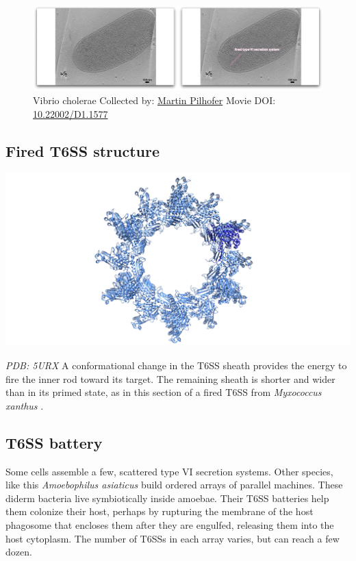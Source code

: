 \documentclass[]{tufte-book}
\begin{document}
\begin{figure}
\includegraphics{movie_stills/9_7} \caption[Vibrio cholerae Collected by:
\protect\hyperlink{martin_pilhofer}{Martin Pilhofer} Movie DOI:
\href{https://doi.org/10.22002/D1.1577}{10.22002/D1.1577}]{Vibrio cholerae Collected by:
\protect\hyperlink{martin_pilhofer}{Martin Pilhofer} Movie DOI:
\href{https://doi.org/10.22002/D1.1577}{10.22002/D1.1577}}\label{fig:9-7}
\end{figure}

\subsection{Fired T6SS structure}\label{Fired_T6SS_structure}

\includegraphics{img/schematics/9_7_1}

\emph{PDB: 5URX} A conformational change in the T6SS sheath provides the
energy to fire the inner rod toward its target. The remaining sheath is
shorter and wider than in its primed state, as in this section of a
fired T6SS from \emph{Myxococcus xanthus} \citep{chang2017}.

\hypertarget{T6SS_battery}{\subsection{T6SS
battery}\label{T6SS_battery}}

Some cells assemble a few, scattered type VI secretion systems. Other
species, like this \emph{Amoebophilus asiaticus} build ordered arrays of
parallel machines. These diderm bacteria live symbiotically inside
amoebae. Their T6SS batteries help them colonize their host, perhaps by
rupturing the membrane of the host phagosome that encloses them after
they are engulfed, releasing them into the host cytoplasm. The number of
T6SSs in each array varies, but can reach a few dozen.
\end{document}

